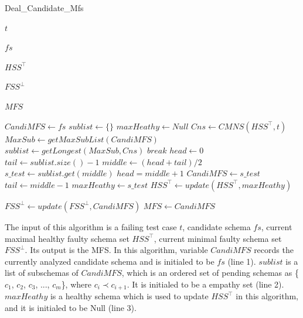 \documentclass{sig-alternate-05-2015}
\begin{document}
{{\begin{algorithm}\label{al:identifyOneMFS}
  \caption{Deal\_Candidate\_Mfs}
  \begin{algorithmic}[1]
     \Require  $t$ 


     $fs$ 

     $HSS^{\top}$ 

     $FSS^{\bot}$ 

     \Ensure  $MFS$ 

   \State $CandiMFS \leftarrow fs$
   \State $sublist \leftarrow \{\}$
   \State $maxHeathy \leftarrow Null$
        \State $Cns \leftarrow CMNS(HSS^{\top}, t) $
        \State $MaxSub \leftarrow getMaxSubList(CandiMFS)$
        \State $sublist \leftarrow  getLongest(MaxSub, Cns)$
            \State $break$
         \EndIf
        \State $head  \leftarrow 0$
        \State $tail \leftarrow sublist.size() - 1 $
        \State $middle \leftarrow (head + tail) / 2$
        \State $s\_test \leftarrow sublist.get(middle)$
            \State $head = middle + 1$
            \State $CandiMFS \leftarrow s\_test$
        \Else
            \State $tail \leftarrow middle - 1  $
            \State $maxHeathy \leftarrow s\_test$
        \EndIf
        \EndWhile
        \State $HSS^{\top} \leftarrow update(HSS^{\top}, maxHeathy)$

    \EndWhile
    \State $FSS^{\bot} \leftarrow update(FSS^{\bot}, CandiMFS)$
    \State $MFS \leftarrow  CandiMFS$
  \end{algorithmic}
\end{algorithm}

The input of this algorithm is a failing test case $t$,  candidate schema $fs$, current maximal healthy faulty schema set $HSS^{\top}$, current minimal faulty schema set $FSS^{\bot}$. Its output is the MFS. In this algorithm, variable $CandiMFS$ records the currently analyzed candidate schema and is initialed to be $fs$ (line 1). $sublist$ is a list of subschemas of $CandiMFS$, which is an ordered set of pending schemas as \{$c_{1}$, $c_{2}$, $c_{3}$, ..., $c_{m}$\}, where $c_{i} \prec c_{i+1}$. It is initialed to be a empathy set (line 2). $maxHeathy$ is a healthy schema which is used to update  $HSS^{\top}$ in this algorithm, and it is initialed to be Null (line 3).

}}
\end{document}
